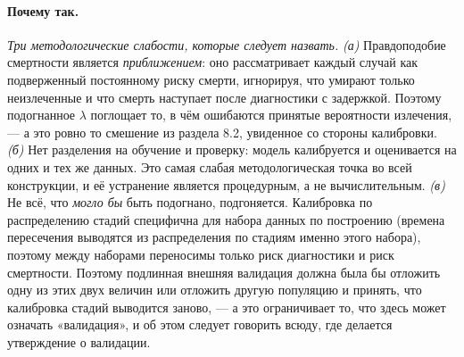 \documentclass[12pt,a4paper]{article}
\newcommand{\why}[1]{\paragraph{Почему так.} #1}
\begin{document}
\why{\emph{Три методологические слабости, которые следует назвать.}
\emph{(а)} Правдоподобие смертности является \emph{приближением}: оно рассматривает каждый случай как
подверженный постоянному риску смерти, игнорируя, что умирают только неизлеченные и что смерть наступает
после диагностики с задержкой. Поэтому подогнанное $\lambda$ поглощает то, в чём ошибаются принятые
вероятности излечения, --- а это ровно то смешение из раздела 8.2, увиденное со стороны калибровки.
\emph{(б)} Нет разделения на обучение и проверку: модель калибруется и оценивается на одних и тех же
данных. Это самая слабая методологическая точка во всей конструкции, и её устранение является процедурным, а
не вычислительным.
\emph{(в)} Не всё, что \emph{могло бы} быть подогнано, подгоняется. Калибровка по распределению стадий
специфична для набора данных по построению (времена пересечения выводятся из распределения по стадиям
именно этого набора), поэтому между наборами переносимы только риск диагностики и риск смертности. Поэтому
подлинная внешняя валидация должна была бы отложить одну из этих двух величин или отложить другую
популяцию и принять, что калибровка стадий выводится заново, --- а это ограничивает то, что здесь может
означать «валидация», и об этом следует говорить всюду, где делается утверждение о валидации.}
\end{document}

